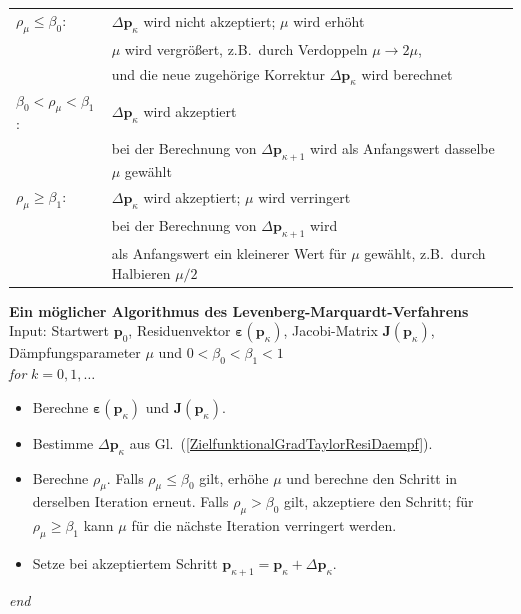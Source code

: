 \begin{tabular}{ll}
\hline\hline
$\rho_{\mu} \le \beta_0 $: &
$\Delta \mathbf{p}_\kappa$ wird nicht akzeptiert; $\mu$ wird erhöht \\
& $\mu$ wird vergrößert, z.B.\ durch Verdoppeln $\mu \rightarrow 2\mu$,\\
 & und die neue zugehörige Korrektur $\Delta \mathbf{p}_\kappa$ wird berechnet\\
\hline
$\beta_0 < \rho_{\mu} < \beta_1$: & $\Delta \mathbf{p}_\kappa$ wird akzeptiert \\
 & bei der Berechnung von $\Delta \mathbf{p}_{\kappa+1}$
  wird als Anfangswert dasselbe $\mu$ gewählt \\
\hline
$\rho_{\mu} \ge \beta_1$: & $\Delta \mathbf{p}_\kappa$ wird akzeptiert; $\mu$ wird verringert \\
& bei der Berechnung von $\Delta \mathbf{p}_{\kappa+1}$ wird \\
 & als Anfangswert ein kleinerer Wert für $\mu$ gewählt, z.B.\ durch Halbieren $\mu / 2$ \\
\hline\hline
\end{tabular}

\newpage
\textbf{Ein möglicher Algorithmus des Levenberg-Marquardt-Verfahrens} \\
Input: Startwert $\mathbf{p}_0$, Residuenvektor
$\boldsymbol{\varepsilon}(\mathbf{p}_{\kappa})$, Jacobi-Matrix
$\boldsymbol{J}(\mathbf{p}_{\kappa})$, Dämpfungsparameter $\mu$ und
$0<\beta_0<\beta_1<1$ \\
\hspace*{1em} \textit{for} $k = 0,1, \ldots$
\begin{itemize}
	\item[i)] Berechne $\boldsymbol{\varepsilon}(\mathbf{p}_{\kappa})$ und
	$\boldsymbol{J}(\mathbf{p}_{\kappa})$.
	\item[ii)] Bestimme $\Delta\mathbf{p}_\kappa$ aus
	Gl.~(\ref{ZielfunktionalGradTaylorResiDaempf}).
	\item[iii)] Berechne $\rho_\mu$. Falls $\rho_\mu\le\beta_0$ gilt,
	erhöhe $\mu$ und berechne den Schritt in derselben Iteration erneut.
	Falls $\rho_\mu>\beta_0$ gilt, akzeptiere den Schritt; für
	$\rho_\mu\ge\beta_1$ kann $\mu$ für die nächste Iteration verringert werden.
	\item[iv)] Setze bei akzeptiertem Schritt
	$\mathbf{p}_{\kappa+1}=\mathbf{p}_\kappa+\Delta\mathbf{p}_\kappa$.
\end{itemize}
\hspace*{1em} \textit{end} \\

